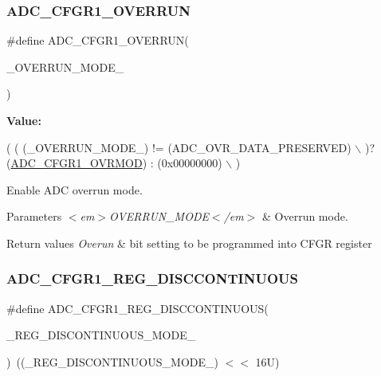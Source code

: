 \subsubsection{\texorpdfstring{A\+D\+C\+\_\+\+C\+F\+G\+R1\+\_\+\+O\+V\+E\+R\+R\+UN}{ADC\_CFGR1\_OVERRUN}}
{\footnotesize\ttfamily \#define A\+D\+C\+\_\+\+C\+F\+G\+R1\+\_\+\+O\+V\+E\+R\+R\+UN(\begin{DoxyParamCaption}\item[{}]{\+\_\+\+O\+V\+E\+R\+R\+U\+N\+\_\+\+M\+O\+D\+E\+\_\+ }\end{DoxyParamCaption})}

{\bfseries Value\+:}
\begin{DoxyCode}
( ( (\_OVERRUN\_MODE\_) != (ADC\_OVR\_DATA\_PRESERVED)                             \(\backslash\)
    )? (\hyperlink{group___peripheral___registers___bits___definition_gadbd980c2b24383afb370bfe69860064f}{ADC\_CFGR1\_OVRMOD}) : (0x00000000)                                       \(\backslash\)
  )
\end{DoxyCode}


Enable A\+DC overrun mode. 


\begin{DoxyParams}{Parameters}
{\em $<$em$>$\+O\+V\+E\+R\+R\+U\+N\+\_\+\+M\+O\+D\+E$<$/em$>$} & Overrun mode. \\
\hline
\end{DoxyParams}

\begin{DoxyRetVals}{Return values}
{\em Overun} & bit setting to be programmed into C\+F\+GR register \\
\hline
\end{DoxyRetVals}
\mbox{\label{group___a_d_c___private___macros_gaa0ec9cb0b5d97ba2d8bfd4fdf1f2a398}} 
\subsubsection{\texorpdfstring{A\+D\+C\+\_\+\+C\+F\+G\+R1\+\_\+\+R\+E\+G\+\_\+\+D\+I\+S\+C\+C\+O\+N\+T\+I\+N\+U\+O\+US}{ADC\_CFGR1\_REG\_DISCCONTINUOUS}}
{\footnotesize\ttfamily \#define A\+D\+C\+\_\+\+C\+F\+G\+R1\+\_\+\+R\+E\+G\+\_\+\+D\+I\+S\+C\+C\+O\+N\+T\+I\+N\+U\+O\+US(\begin{DoxyParamCaption}\item[{}]{\+\_\+\+R\+E\+G\+\_\+\+D\+I\+S\+C\+O\+N\+T\+I\+N\+U\+O\+U\+S\+\_\+\+M\+O\+D\+E\+\_\+ }\end{DoxyParamCaption})~((\+\_\+\+R\+E\+G\+\_\+\+D\+I\+S\+C\+O\+N\+T\+I\+N\+U\+O\+U\+S\+\_\+\+M\+O\+D\+E\+\_\+) $<$$<$ 16\+U)}



